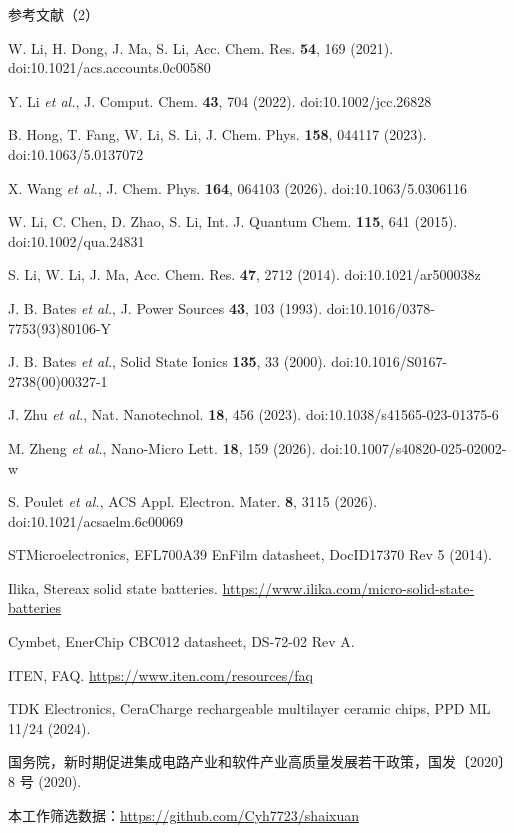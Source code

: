 \documentclass[aspectratio=169,10pt]{beamer}
\newcommand{\rf}[1]{\par\noindent\makebox[2.2em][r]{[#1]}\hspace{.6em}\ignorespaces}
\begin{document}
\begin{frame}[t]{参考文献（2）}
\fontsize{7}{10}\selectfont\setlength{\parskip}{0pt}
\rf{19}W. Li, H. Dong, J. Ma, S. Li, Acc. Chem. Res. \textbf{54}, 169 (2021). doi:10.1021/acs.accounts.0c00580
\rf{20}Y. Li \textit{et al.}, J. Comput. Chem. \textbf{43}, 704 (2022). doi:10.1002/jcc.26828
\rf{21}B. Hong, T. Fang, W. Li, S. Li, J. Chem. Phys. \textbf{158}, 044117 (2023). doi:10.1063/5.0137072
\rf{22}X. Wang \textit{et al.}, J. Chem. Phys. \textbf{164}, 064103 (2026). doi:10.1063/5.0306116
\rf{23}W. Li, C. Chen, D. Zhao, S. Li, Int. J. Quantum Chem. \textbf{115}, 641 (2015). doi:10.1002/qua.24831
\rf{24}S. Li, W. Li, J. Ma, Acc. Chem. Res. \textbf{47}, 2712 (2014). doi:10.1021/ar500038z
\rf{26}J. B. Bates \textit{et al.}, J. Power Sources \textbf{43}, 103 (1993). doi:10.1016/0378-7753(93)80106-Y
\rf{27}J. B. Bates \textit{et al.}, Solid State Ionics \textbf{135}, 33 (2000). doi:10.1016/S0167-2738(00)00327-1
\rf{28}J. Zhu \textit{et al.}, Nat. Nanotechnol. \textbf{18}, 456 (2023). doi:10.1038/s41565-023-01375-6
\rf{29}M. Zheng \textit{et al.}, Nano-Micro Lett. \textbf{18}, 159 (2026). doi:10.1007/s40820-025-02002-w
\rf{30}S. Poulet \textit{et al.}, ACS Appl. Electron. Mater. \textbf{8}, 3115 (2026). doi:10.1021/acsaelm.6c00069
\rf{31}STMicroelectronics, EFL700A39 EnFilm datasheet, DocID17370 Rev 5 (2014).
\rf{32}Ilika, Stereax solid state batteries. \url{https://www.ilika.com/micro-solid-state-batteries}
\rf{33}Cymbet, EnerChip CBC012 datasheet, DS-72-02 Rev A.
\rf{34}ITEN, FAQ. \url{https://www.iten.com/resources/faq}
\rf{35}TDK Electronics, CeraCharge rechargeable multilayer ceramic chips, PPD ML 11/24 (2024).
\rf{36}国务院，新时期促进集成电路产业和软件产业高质量发展若干政策，国发〔2020〕8 号 (2020).
\rf{--}本工作筛选数据：\url{https://github.com/Cyh7723/shaixuan}
\end{frame}

\end{document}
